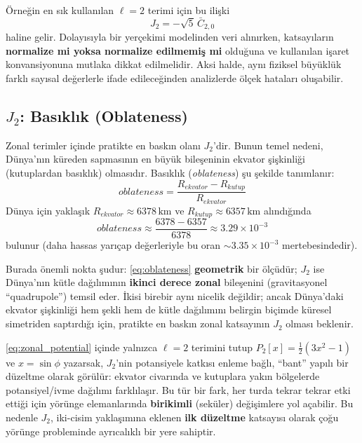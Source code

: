 Örneğin en sık kullanılan $\ell=2$ terimi için bu ilişki
\begin{equation}
J_2 = -\sqrt{5}\,\bar C_{2,0}
\label{eq:J2_C20}
\end{equation}
haline gelir. Dolayısıyla bir yerçekimi modelinden veri alınırken, katsayıların \textbf{normalize mi yoksa normalize edilmemiş mi} olduğuna ve kullanılan işaret konvansiyonuna mutlaka dikkat edilmelidir. Aksi halde, aynı fiziksel büyüklük farklı sayısal değerlerle ifade edileceğinden analizlerde ölçek hataları oluşabilir.

\newpage
\subsection{$J_2$: Basıklık (Oblateness)}
\label{subsec:J2_physical}

Zonal terimler içinde pratikte en baskın olanı $J_2$’dir.
Bunun temel nedeni, Dünya’nın küreden sapmasının en büyük bileşeninin
ekvator şişkinliği (kutuplardan basıklık) olmasıdır.
Basıklık (\emph{oblateness}) şu şekilde tanımlanır:
\begin{equation}
    oblateness = \frac{R_{ekvator} - R_{kutup}}{R_{ekvator}}
    \label{eq:oblateness}
\end{equation}
Dünya için yaklaşık $R_{ekvator} \approx 6378\,\mathrm{km}$ ve $R_{kutup} \approx 6357\,\mathrm{km}$ alındığında
\[
oblateness \approx \frac{6378-6357}{6378} \approx 3.29\times 10^{-3}
\]
bulunur (daha hassas yarıçap değerleriyle bu oran $\sim 3.35\times 10^{-3}$ mertebesindedir).

Burada önemli nokta şudur: \eqref{eq:oblateness} \textbf{geometrik} bir ölçüdür; $J_2$ ise Dünya’nın kütle dağılımının
\textbf{ikinci derece zonal} bileşenini (gravitasyonel ``quadrupole'') temsil eder.
İkisi birebir aynı nicelik değildir; ancak Dünya’daki ekvator şişkinliği hem şekli hem de kütle dağılımını belirgin biçimde
küresel simetriden saptırdığı için, pratikte en baskın zonal katsayının $J_2$ olması beklenir.

\eqref{eq:zonal_potential} içinde yalnızca $\ell=2$ terimini tutup
$P_2[x]=\tfrac12(3x^2-1)$ ve $x=\sin\phi$ yazarsak,
$J_2$’nin potansiyele katkısı enleme bağlı, ``bant'' yapılı bir düzeltme olarak görülür:
ekvator civarında ve kutuplara yakın bölgelerde potansiyel/ivme dağılımı farklılaşır.
Bu tür bir fark, her turda tekrar tekrar etki ettiği için yörünge elemanlarında \textbf{birikimli} (seküler) değişimlere yol açabilir.
Bu nedenle $J_2$, iki-cisim yaklaşımına eklenen \textbf{ilk düzeltme} katsayısı olarak çoğu yörünge probleminde ayrıcalıklı bir yere sahiptir.

